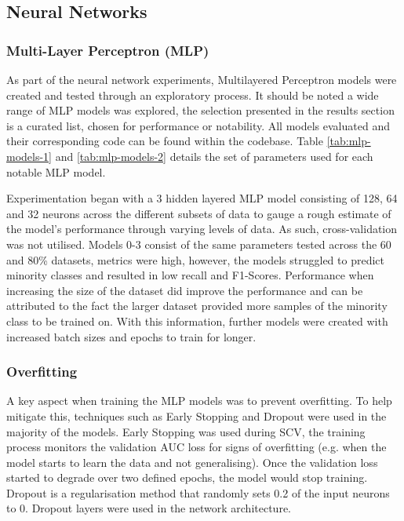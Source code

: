 \subsection{Neural Networks}
\label{sec: Neural Networks}

\subsubsection{Multi-Layer Perceptron (MLP)}
\label{sec: MLP Neural Network v1}

As part of the neural network experiments, Multilayered Perceptron models were created and tested through an exploratory process. It should be noted a wide range of MLP models was explored, the selection presented in the results section is a curated list, chosen for performance or notability. All models evaluated and their corresponding code can be found within the codebase. Table \ref{tab:mlp-models-1} and \ref{tab:mlp-models-2} details the set of parameters used for each notable MLP model.  

Experimentation began with a 3 hidden layered MLP model consisting of 128, 64 and 32 neurons across the different subsets of data to gauge a rough estimate of the model's performance through varying levels of data. As such, cross-validation was not utilised. Models 0-3 consist of the same parameters tested across the 60 and 80\% datasets, metrics were high, however, the models struggled to predict minority classes and resulted in low recall and F1-Scores. Performance when increasing the size of the dataset did improve the performance and can be attributed to the fact the larger dataset provided more samples of the minority class to be trained on. With this information, further models were created with increased batch sizes and epochs to train for longer.

\subsubsection*{Overfitting}

A key aspect when training the MLP models was to prevent overfitting. To help mitigate this, techniques such as Early Stopping and Dropout were used in the majority of the models. Early Stopping was used during SCV, the training process monitors the validation AUC loss for signs of overfitting (e.g. when the model starts to learn the data and not generalising). Once the validation loss started to degrade over two defined epochs, the model would stop training. Dropout is a regularisation method that randomly sets 0.2 of the input neurons to 0. Dropout layers were used in the network architecture.


